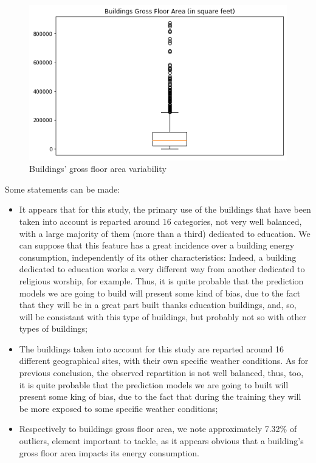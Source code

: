 \documentclass[twocolumn, switch]{article}
\begin{document}
\begin{figure}[H]
\centering
\includegraphics[scale=0.35]{../graphs/buildings_gross_floor_area}
\caption{Buildings' gross floor area variability}
\label{fig:buildings_gross_floor_area}
\end{figure}

Some statements can be made:

\begin{itemize}
\item It appears that for this study, the primary use of the buildings that have been taken into account is reparted around $16$ categories, not very well balanced, with a large majority of them (more than a third) dedicated to education. We can suppose that this feature has a great incidence over a building energy consumption, independently of its other characteristics: Indeed, a building dedicated to education works a very different way from another dedicated to religious worship, for example. Thus, it is quite probable that the prediction models we are going to build will present some kind of bias, due to the fact that they will be in a great part built thanks education buildings, and, so, will be consistant with this type of buildings, but probably not so with other types of buildings;
\item The buildings taken into account for this study are reparted around 16 different geographical sites, with their own specific weather conditions. As for previous conclusion, the observed repartition is not well balanced, thus, too, it is quite probable that the prediction models we are going to built will present some king of bias, due to the fact that during the training they will be more exposed to some specific weather conditions;
\item Respectively to buildings gross floor area, we note approximately 7.32\% of outliers, element important to tackle, as it appears obvious that a building's gross floor area impacts its energy consumption.
\end{itemize}
\end{document}
